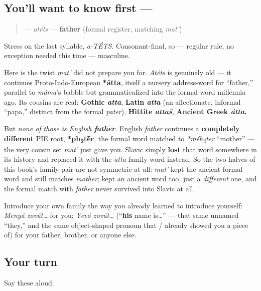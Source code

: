 \subsection*{You'll want to know first — }
\begin{quote}
\textbf{} — \emph{atéts} — \textbf{father} (formal register, matching \emph{mat'})
\end{quote}

Stress on the last syllable, \emph{a-TÉTS}. Consonant-final, so — regular rule, no exception needed this time — masculine.

\begin{cousinweb}
Here is the twist \emph{mat'} did not prepare you for. \emph{Atéts} is genuinely old — it continues Proto-Indo-European \textbf{*átta}, itself a nursery address-word for \textquotedblleft{}father,\textquotedblright{} parallel to \emph{máma}'s babble but grammaticalized into the formal word millennia ago. Its cousins are real: \textbf{Gothic \emph{atta}}, \textbf{Latin \emph{atta}} (an affectionate, informal \textquotedblleft{}papa,\textquotedblright{} distinct from the formal \emph{pater}), \textbf{Hittite \emph{attaš}}, \textbf{Ancient Greek \emph{átta}.}

But \emph{none of those is English \textbf{father}}. English \emph{father} continues a \textbf{completely different} PIE root, \textbf{*ph\textsubscript{2}t\'{\={e}}r}, the formal word matched to \emph{*méh\textsubscript{2}tēr} \textquotedblleft{}mother\textquotedblright{} — the very cousin set \emph{mat'} just gave you. Slavic simply \textbf{lost} that word somewhere in its history and replaced it with the \emph{atta}-family word instead. So the two halves of this book's family pair are not symmetric at all: \emph{mat'} kept the ancient formal word and still matches \emph{mother}; \textbf{} kept an ancient word too, just a \emph{different} one, and the formal match with \emph{father} never survived into Slavic at all.

Introduce your own family the way you already learned to introduce yourself: \emph{Menyá zovút…} for you; \emph{Yevó zovút…} (\textquotedblleft{}\textbf{his} name is…\textquotedblright{} — that same unnamed \textquotedblleft{}they,\textquotedblright{} and the same object-shaped pronoun \emph{} that \emph{}/\emph{} already showed you a piece of) for your father, brother, or anyone else.
\end{cousinweb}

\subsection*{Your turn}
Say these aloud:

